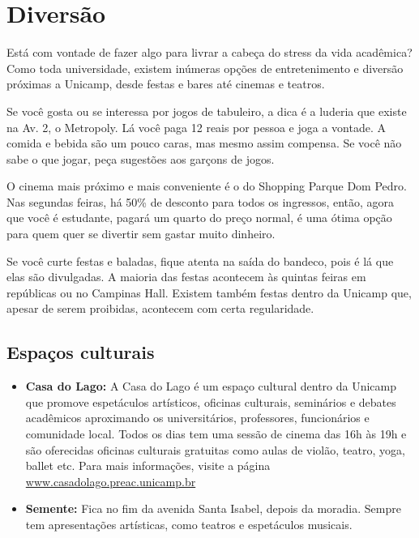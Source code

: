 
\section{Diversão}
Está com vontade de fazer algo para livrar a cabeça do stress da vida
acadêmica? Como toda universidade, existem inúmeras opções de entretenimento e
diversão próximas a Unicamp, desde festas e bares até cinemas e teatros.

Se você gosta ou se interessa por jogos de tabuleiro, a dica é a luderia que
existe na Av. 2, o Metropoly. Lá você paga 12 reais por pessoa e joga a
vontade. A comida e bebida são um pouco caras, mas mesmo assim compensa. Se
você não sabe o que jogar, peça sugestões aos garçons de jogos.

O cinema mais próximo e mais conveniente é o do Shopping Parque Dom Pedro. Nas
segundas feiras, há 50\% de desconto para todos os ingressos, então, agora que
você é estudante, pagará um quarto do preço normal, é uma ótima opção para quem
quer se divertir sem gastar muito dinheiro.

Se você curte festas e baladas, fique atenta na saída do bandeco, pois é lá que
elas são divulgadas. A maioria das festas acontecem às quintas feiras em
repúblicas ou no Campinas Hall. Existem também festas dentro da Unicamp que,
apesar de serem proibidas, acontecem com certa regularidade.

\subsection{Espaços culturais}

\begin{itemize}
    \item   \textbf{Casa do Lago:} A Casa do Lago é um espaço cultural dentro
    	da Unicamp que promove espetáculos artísticos, oficinas culturais,
    	seminários e debates acadêmicos aproximando os universitários,
    	professores, funcionários e comunidade local. Todos os dias tem uma
    	sessão de cinema das 16h às 19h e são oferecidas oficinas culturais
    	gratuitas como aulas de violão, teatro, yoga, ballet etc. Para mais
    	informações, visite a página \url{www.casadolago.preac.unicamp.br}


    \item   \textbf{Semente:} Fica no fim da avenida Santa Isabel, depois da
        moradia. Sempre tem apresentações artísticas, como teatros e
        espetáculos musicais.
\end{itemize}

